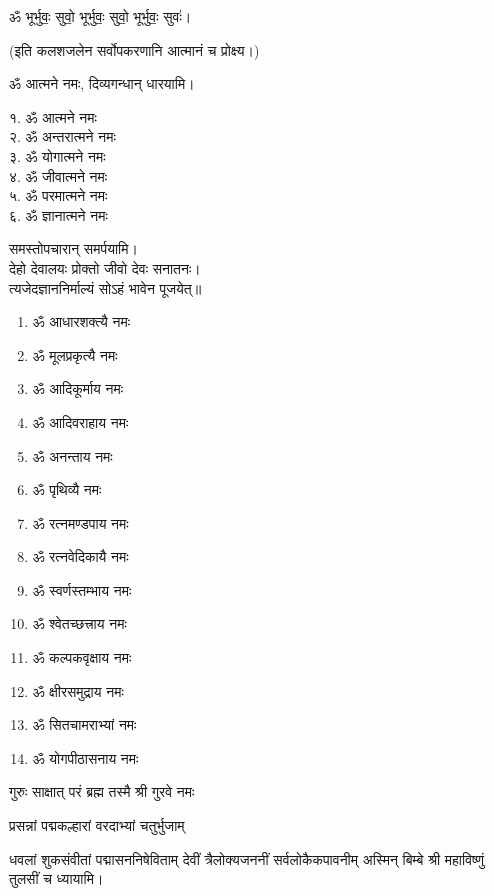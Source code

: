 \centerline{ॐ भूर्भुवः॒ सुवो॒ भूर्भुवः॒ सुवो॒ भूर्भुवः॒ सुवः॑।}

(इति कलशजलेन सर्वोपकरणानि आत्मानं च प्रोक्ष्य।)

ॐ आत्मने नमः, दिव्यगन्धान् धारयामि।
\begin{multicols}{2}
१. ॐ आत्मने नमः\\
२. ॐ अन्तरात्मने नमः\\
३. ॐ योगात्मने नमः\\
४. ॐ जीवात्मने नमः\\
५. ॐ परमात्मने नमः\\
६. ॐ ज्ञानात्मने नमः
\end{multicols}
समस्तोपचारान् समर्पयामि।\\

देहो देवालयः प्रोक्तो जीवो देवः सनातनः।\\
त्यजेदज्ञाननिर्माल्यं सोऽहं भावेन पूजयेत्॥\\

\begin{multicols}{2}
\begin{enumerate}
\item ॐ आधारशक्त्यै नमः
\item ॐ मूलप्रकृत्यै नमः
\item ॐ आदिकूर्माय नमः
\item ॐ आदिवराहाय नमः
\item ॐ अनन्ताय नमः
\item ॐ पृथिव्यै नमः
\item ॐ रत्नमण्डपाय नमः
\item ॐ रत्नवेदिकायै नमः
\item ॐ स्वर्णस्तम्भाय नमः
\item ॐ श्वेतच्छत्त्राय नमः
\item ॐ कल्पकवृक्षाय नमः
\item ॐ क्षीरसमुद्राय नमः
\item ॐ सितचामराभ्यां नमः
\item ॐ योगपीठासनाय नमः
\end{enumerate}
\end{multicols}

{गुरुः साक्षात् परं ब्रह्म तस्मै श्री गुरवे नमः}

\centering

{प्रसन्नां पद्मकल्हारां वरदाभ्यां चतुर्भुजाम्}

{धवलां शुकसंवीतां पद्मासननिषेविताम्}
{देवीं त्रैलोक्यजननीं सर्वलोकैकपावनीम्}
अस्मिन् बिम्बे श्री महाविष्णुं तुलसीं च ध्यायामि।

